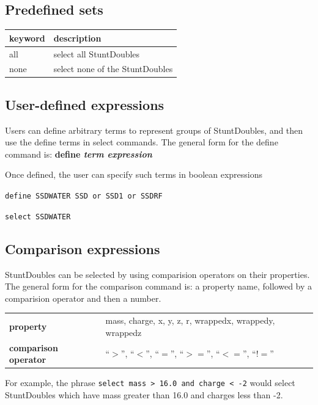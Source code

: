 \documentclass[]{book}
\begin{document}
\subsection{\label{section:predefined}Predefined sets}

\begin{center}
\begin{tabular}{|ll|}
\hline
{\bf keyword} & {\bf description} \\
\hline
all & select all StuntDoubles \\
none & select none of the StuntDoubles \\
\hline
\end{tabular}
\end{center}

\subsection{\label{section:userdefined}User-defined expressions}

Users can define arbitrary terms to represent groups of StuntDoubles,
and then use the define terms in select commands. The general form for
the define command is: {\bf define {\it term expression}}

Once defined, the user can specify such terms in boolean expressions

{\tt define SSDWATER SSD or SSD1 or SSDRF}

{\tt select SSDWATER}

\subsection{\label{section:comparison}Comparison expressions}

StuntDoubles can be selected by using comparision operators on their
properties. The general form for the comparison command is: a property
name, followed by a comparision operator and then a number. 

\begin{center}
\begin{tabular}{|l|l|}
\hline
{\bf property} & mass, charge, x, y, z, r, wrappedx, wrappedy, wrappedz \\
{\bf comparison operator} & ``$>$'', ``$<$'', ``$=$'', ``$>=$'',
``$<=$'', ``$!=$'' \\
\hline
\end{tabular}
\end{center}

For example, the phrase {\tt select mass > 16.0 and charge < -2}
would select StuntDoubles which have mass greater than 16.0 and charges
less than -2.
 
\end{document}
